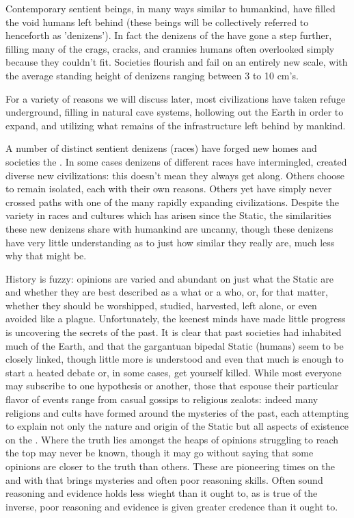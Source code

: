 \documentclass[twoside, 12pt, letterpaper]{report}\usepackage[]{graphicx}\usepackage[]{color}
\begin{document}
\begin{multicols*}{2}
Contemporary sentient beings, in many ways similar to humankind, have filled the void humans left behind (these beings will be collectively referred to henceforth as 'denizens'). In fact the denizens of the \mw have gone a step further, filling many of the crags, cracks, and crannies humans often overlooked simply because they couldn't fit. Societies flourish and fail on an entirely new scale, with the average standing height of denizens ranging between 3 to 10 cm's.

For a variety of reasons we will discuss later, most civilizations have taken refuge underground, filling in natural cave systems, hollowing out the Earth in order to expand, and utilizing what remains of the infrastructure left behind by mankind.

A number of distinct sentient denizens (races) have forged new homes and societies \ooi the \mw. In some cases denizens of different races have intermingled, created diverse new civilizations: this doesn't mean they always get along. Others choose to remain isolated, each with their own reasons. Others yet have simply never crossed paths with one of the many rapidly expanding civilizations. Despite the variety in races and cultures which has arisen since the Static, the similarities these new denizens share with humankind are uncanny, though these denizens have very little understanding as to just how similar they really are, much less why that might be.

History is fuzzy: opinions are varied and abundant on just what the Static are and whether they are best described as a what or a who, or, for that matter, whether they should be worshipped, studied, harvested, left alone, or even avoided like a plague. Unfortunately, the keenest minds have made little progress is uncovering the secrets of the past. It is clear that past societies had inhabited much of the Earth, and that the gargantuan bipedal Static (humans) seem to be closely linked, though little more is understood and even that much is enough to start a heated debate or, in some cases, get yourself killed. While most everyone may subscribe to one hypothesis or another, those that espouse their particular flavor of events range from casual gossips to religious zealots: indeed many religions and cults have formed around the mysteries of the past, each attempting to explain not only the nature and origin of the Static but all aspects of existence on the \mw. Where the truth lies amongst the heaps of opinions struggling to reach the top may never be known, though it may go without saying that some opinions are closer to the truth than others. These are pioneering times on the \mw and with that brings mysteries and often poor reasoning skills. Often sound reasoning and evidence holds less wieght than it ought to, as is true of the inverse, poor reasoning and evidence is given greater credence than it ought to. 

\end{multicols*}
\end{document}
